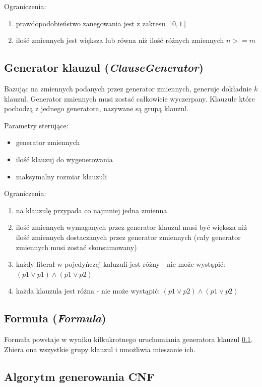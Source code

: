 \documentclass[a4paper,12pt]{article}
\begin{document}
\noindent
Ograniczenia:
\begin{enumerate}
  \item prawdopodobieństwo zanegowania jest z zakresu $[0,1]$
  \item ilość zmiennych jest większa lub równa niż ilość różnych zmiennych $n>=m$
\end{enumerate}

\subsection{Generator klauzul (\textit{ClauseGenerator})} \label{ClauseGenerator}

Bazując na zmiennych podanych przez generator zmiennych, generuje dokładnie $k$ klauzul. Generator zmiennych musi zostać całkowicie wyczerpany. Klauzule które pochodzą z jednego generatora, nazywane są grupą klauzul.

\noindent
Parametry sterujące:
\begin{itemize}
  \item generator zmiennych
  \item ilość klauzuj do wygenerowania
  \item maksymalny rozmiar klauzuli
\end{itemize}

\noindent
Ograniczenia:
\begin{enumerate}
  \item na klauzulę przypada co najmniej jedna zmienna
  \item ilość zmiennych wymaganych przez generator klauzul musi być większa niż ilość zmiennych dostaczanych przez generator zmiennych (cały generator zmiennych musi zostać skonsumowany)
  \item każdy literał w pojedyńczej kaluzuli jest różny - nie może wystąpić: $(p1 \lor p1) \land (p1 \lor p2)$
  \item każda klauzula jest różna - nie może wystąpić: $(p1 \lor p2) \land (p1 \lor p2)$
\end{enumerate}

\subsection{Formuła (\textit{Formula})}

Formuła powstaje w wyniku kilkukrotnego uruchomiania generatora klauzul \ref{ClauseGenerator}. Zbiera ona wszystkie grupy klauzul i umożliwia mieszanie ich.

\subsection{Algorytm generowania CNF}
\end{document}
